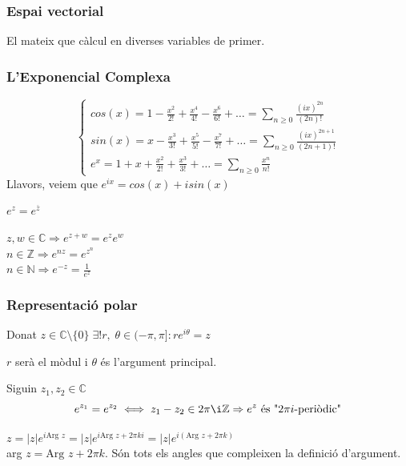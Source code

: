 \documentclass[../main.tex]{subfiles}
\begin{document}
\subsubsection{Espai vectorial}
El mateix que càlcul en diverses variables de primer.\\
\subsubsection{L'Exponencial Complexa}
\begin{displaymath}
\begin{cases}
	cos(x) = 1 - \frac{x^2}{2!} + \frac{x^4}{4!} - \frac{x^6}{6!} + \ldots = \sum_{n\geq 0} \frac{(ix)^{2n}}{(2n)!}\\
	sin(x) = x - \frac{x^3}{3!} + \frac{x^5}{5!} - \frac{x^7}{7!} + \ldots = \sum_{n\geq 0} \frac{(ix)^{2n+1}}{(2n+1)!}\\
	e^x = 1 + x + \frac{x^2}{2!} + \frac{x^3}{3!} + \ldots = \sum_{n\geq 0} \frac{x^n}{n!}
\end{cases}
\end{displaymath}
Llavors, veiem que $e^{ix} = cos(x) + isin(x)$
\begin{proposicio}
$e^z = e^{\overline{z}}$
\end{proposicio}
\begin{proposicio}
	$z, w \in \mathbb{C} \Rightarrow e^{z+w} = e^ze^w$\\
	$n \in \mathbb{Z} \Rightarrow e^{nz} = e^{z^n}$\\
	$n \in \mathbb{N} \Rightarrow e^{-z} = \frac{1}{e^z}$
\end{proposicio}
\subsubsection{Representació polar}
\begin{definicio}
	Donat $z \in \mathbb{C}\setminus\{0\}\;\exists! r,\;\theta \in (-\pi, \pi]: re^{i\theta} = z$
\end{definicio}
$r$ serà el mòdul i $\theta$ és l'argument principal.

\begin{proposicio}
Siguin $z_1, z_2 \in \mathbb{C}$
\begin{displaymath}
	e^{z_1} = e^{z_2} \iff z_1 - z_2 \in 2\pi\i \mathbb{Z} \Rightarrow e^z \text{ és "$2\pi i$-periòdic"}
\end{displaymath}
\end{proposicio}
\begin{definicio}
	$z = |z|e^{i\text{Arg } z} = |z|e^{i\text{Arg }z + 2\pi ki} = |z|e^{i(\text{Arg }z + 2\pi k)}$\\
	arg $z = \text{Arg }z + 2\pi k$. Són tots els angles que compleixen la definició d'argument.
\end{definicio}
\end{document}
